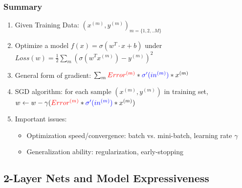 \documentclass{beamer}
\newcommand{\bi}{\begin{itemize}}
\newcommand{\ei}{\end{itemize}}
\newcommand{\be}{\begin{enumerate}}
\newcommand{\ee}{\end{enumerate}}
\begin{document}
\begin{frame}
\frametitle{Summary}
\be
\item Given Training Data: $(x^{(m)},y^{(m)})_{m=\{1,2,..M\}}$
\item Optimize a model $f(x)=\sigma(w^T \cdot x + b)$ under $Loss(w) = \frac{1}{2} \sum_{m}  ( \sigma(w^T x^{(m)}) - y^{(m)} )^2$
\pause
\item General form of gradient: $\sum_m{\color{red} Error^{(m)}} * {\color{blue} \sigma'(in^{(m)})} * x^{(m)}$
\pause
\item SGD algorithm: for each sample $(x^{(m)},y^{(m)})$ in training set,\\
	\hspace{1cm} $w \leftarrow w - \gamma({\color{red} Error^{(m)}} * {\color{blue} \sigma'(in^{(m)})} * x^{(m)})$
\pause
\item Important issues: 
	\bi
	\item Optimization speed/convergence: batch vs. mini-batch, learning rate $\gamma$
	\item Generalization ability: regularization, early-stopping
	\ei
\ee
\end{frame}

\subsection[Expressiveness]{2-Layer Nets and Model Expressiveness}
\end{document}
